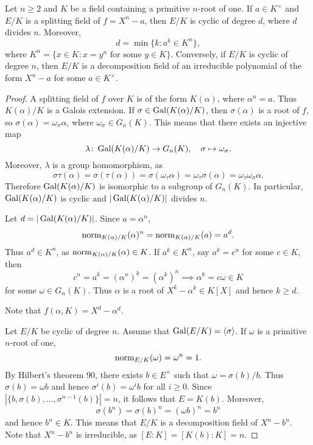 
\begin{proposition}
    Let $n\geq2$ and $K$ be a field containing a primitive $n$-root of one. If 
    $a\in K^{\times}$ and 
    $E/K$ is a splitting field of $f=X^n-a$, then $E/K$ is cyclic
    of degree $d$, where $d$ divides $n$. Moreover, 
    \[
    d=\min\{k:a^k\in K^n\},
    \]
    where $K^n=\{x\in K:x=y^n\text{ for some $y\in K$}\}$. 
    Conversely, 
    if $E/K$ is cyclic of degree $n$, then $E/K$ is a decomposition
    field of an irreducible polynomial 
    of the form $X^n-a$ for some $a\in K^{\times}$. 
\end{proposition}

\begin{proof}
    A splitting field of $f$ over $K$ is
    of the form $K(\alpha)$, where $\alpha^n=a$. Thus 
    $K(\alpha)/K$ is a Galois extension. If $\sigma\in\operatorname{Gal}(K(\alpha)/K)$, 
    then $\sigma(\alpha)$ is a root of $f$, so 
    $\sigma(\alpha)=\omega_\sigma\alpha$, where
    $\omega_\sigma\in G_n(K)$. This means that 
    there exists an injective map
    \[
    \lambda\colon\operatorname{Gal}(K(\alpha)/K)\to G_n(K),
    \quad
    \sigma\mapsto\omega_{\sigma}.
    \]
    Moreover, $\lambda$ is a group homomorphism, as 
    \[
    \sigma\tau(\alpha)=\sigma(\tau(\alpha))=\sigma(\omega_{\tau}\alpha)=\omega_\tau\sigma(\alpha)=\omega_{\tau}\omega_{\sigma}\alpha.
    \]
    Therefore $\operatorname{Gal}(K(\alpha)/K)$ is isomorphic to a subgroup
    of $G_n(K)$. In particular, $\operatorname{Gal}(K(\alpha)/K)$ is cyclic
    and $|\operatorname{Gal}(K(\alpha)/K)|$ divides $n$.
    
    
    Let $d=|\operatorname{Gal}(K(\alpha)/K)|$. Since $a=\alpha^n$, 
    \[
    \operatorname{norm}_{K(\alpha)/K}(\alpha)^n=\operatorname{norm}_{K(\alpha)/K}(a)=a^d.
    \]
    Thus $a^d\in K^n$, as $\operatorname{norm}_{K(\alpha)/K}(\alpha)\in K$. If $a^k\in K^n$, 
    say $a^k=c^n$ for some $c\in K$, then 
    \[
    c^n=a^k=(\alpha^n)^k=(\alpha^k)^n
    \implies 
    \alpha^k=c\omega\in K
    \]
    for some $\omega\in G_n(K)$. Thus $\alpha$ is a root of $X^k-\alpha^k\in K[X]$
    and hence $k\geq d$. 
    
    Note that $f(\alpha,K)=X^d-\alpha^d$. 
    
    Let $E/K$ be cyclic of degree $n$. Assume that  
    $\operatorname{Gal}(E/K)=\langle\sigma\rangle$.
    If $\omega$ is a primitive
    $n$-root of one, 
    \[
    \operatorname{norm}_{E/K}(\omega)=\omega^n=1.
    \]
    By Hilbert's theorem 90, 
    there exists $b\in E^{\times}$ such that 
    $\omega=\sigma(b)/b$. Thus
    $\sigma(b)=\omega b$ and hence 
    $\sigma^i(b)=\omega^i b$ for all $i\geq0$. Since 
    $|\{b,\sigma(b),\dots,\sigma^{n-1}(b)\}|=n$, 
    it follows that $E=K(b)$. Moreover, 
    \[
    \sigma(b^n)=\sigma(b)^n=(\omega b)^n=b^n
    \]
    and hence $b^n\in K$. This means that $E/K$ is a decomposition
    field of $X^n-b^n$. Note that $X^n-b^n$ is irreducible, as 
    $[E:K]=[K(b):K]=n$. 
\end{proof}

